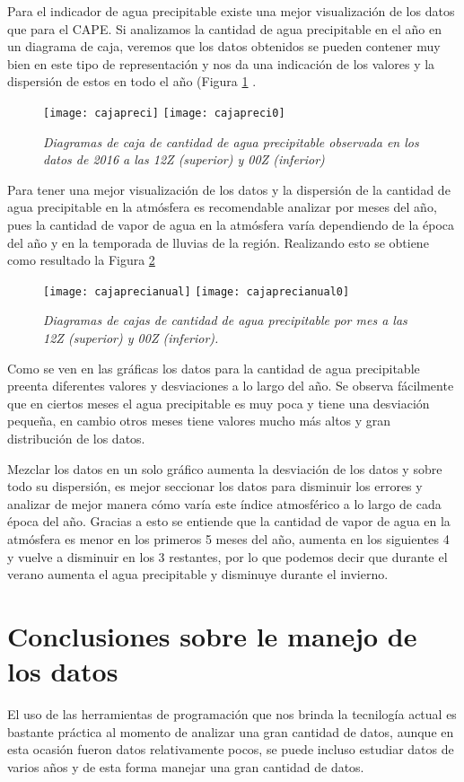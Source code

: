 Para el indicador de agua precipitable existe una mejor visualización de los datos que para el CAPE. Si analizamos la cantidad de agua precipitable en el año en un diagrama de caja, veremos que los datos obtenidos se pueden contener muy bien en este tipo de representación y nos da una indicación de los valores y la dispersión de estos en todo el año (Figura \ref{pbox} .

\begin{figure}[ht!]
\centering
\texttt{[image: cajapreci]} \texttt{[image: cajapreci0]}
\caption{\textit{Diagramas de caja de cantidad de agua precipitable observada en los datos de 2016 a las 12Z (superior) y 00Z (inferior)}}
\label{pbox}
\end{figure}
\pagebreak
Para tener una mejor visualización de los datos y la dispersión de la cantidad de agua precipitable en la atmósfera es recomendable analizar por meses del año, pues la cantidad de vapor de agua en la atmósfera varía dependiendo de la época del año y en la temporada de lluvias de la región. Realizando esto se obtiene como resultado la Figura \ref{precimen}

\begin{figure}[ht!]
\centering
\texttt{[image: cajaprecianual]}
\texttt{[image: cajaprecianual0]}
\caption{\textit{Diagramas de cajas de cantidad de agua precipitable por mes a las 12Z (superior) y 00Z (inferior).}}
\label{precimen}
\end{figure}
\pagebreak
Como se ven en las gráficas los datos para la cantidad de agua precipitable preenta diferentes valores y desviaciones a lo largo del año. Se observa fácilmente que en ciertos meses el agua precipitable es muy poca y tiene una desviación pequeña, en cambio otros meses tiene valores mucho más altos y gran distribución de los datos.

Mezclar los datos en un solo gráfico aumenta la desviación de los datos y sobre todo su dispersión, es mejor seccionar los datos para disminuir los errores y analizar de mejor manera cómo varía este índice atmosférico a lo largo de cada época del año. Gracias a esto se entiende que la cantidad de vapor de agua en la atmósfera es menor en los primeros 5 meses del año, aumenta en los siguientes 4 y vuelve a disminuir en los 3 restantes, por lo que podemos decir que durante el verano aumenta el agua precipitable y disminuye durante el invierno.

\section{Conclusiones sobre le manejo de los datos}
\noindent El uso de las herramientas de programación que nos brinda la tecnilogía actual es bastante práctica al momento de analizar una gran cantidad de datos, aunque en esta ocasión fueron datos relativamente pocos, se puede incluso estudiar datos de varios años y de esta forma manejar una gran cantidad de datos.

